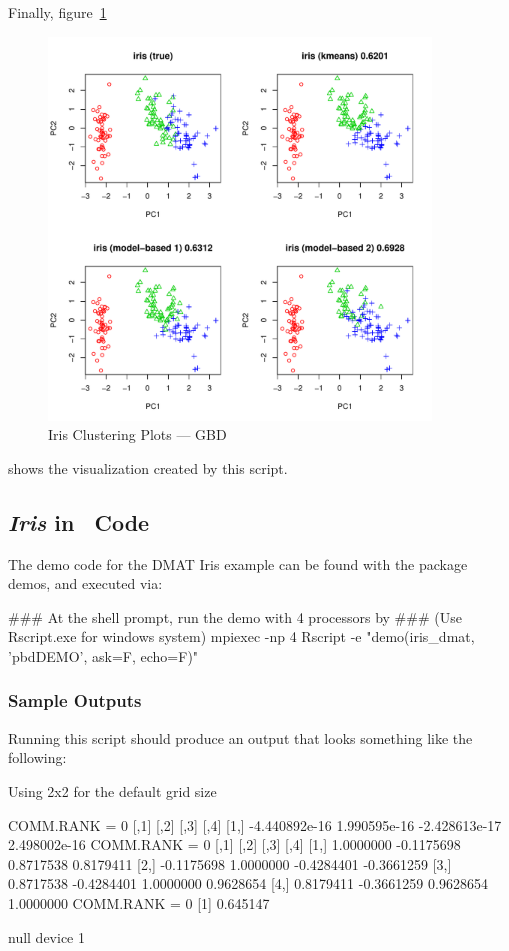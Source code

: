 Finally, figure~\ref{fig:iris_cluster_gbd}
\begin{figure}[h!bt]
  \centering
  \includegraphics[width=4in]{pbdDEMO-include/pics/gbd_plot.pdf}
  \caption{Iris Clustering Plots --- GBD}
  \label{fig:iris_cluster_gbd}
\end{figure}
shows the visualization created by this script.




\subsection{{\it Iris} in \ Code}

The demo code for the DMAT Iris example can be found with the package demos,
and executed via:
\begin{Command}
### At the shell prompt, run the demo with 4 processors by
### (Use Rscript.exe for windows system)
mpiexec -np 4 Rscript -e "demo(iris_dmat, 'pbdDEMO', ask=F, echo=F)"
\end{Command}


\subsubsection{Sample Outputs}
Running this script should produce an output that looks something like the
following:
\begin{Output}
Using 2x2 for the default grid size

COMM.RANK = 0
              [,1]         [,2]          [,3]         [,4]
[1,] -4.440892e-16 1.990595e-16 -2.428613e-17 2.498002e-16
COMM.RANK = 0
           [,1]       [,2]       [,3]       [,4]
[1,]  1.0000000 -0.1175698  0.8717538  0.8179411
[2,] -0.1175698  1.0000000 -0.4284401 -0.3661259
[3,]  0.8717538 -0.4284401  1.0000000  0.9628654
[4,]  0.8179411 -0.3661259  0.9628654  1.0000000
COMM.RANK = 0
[1] 0.645147

null device 
          1 
\end{Output}

